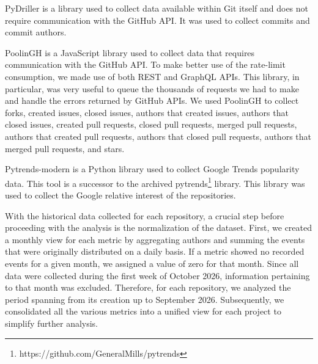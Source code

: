 \documentclass[10pt,conference,peerreview]{IEEEtran}
\begin{document}
PyDriller is a library used to collect data available within Git itself and does not require communication with the GitHub API. It was used to collect commits and commit authors.

PoolinGH is a JavaScript library used to collect data that requires communication with the GitHub API. To make better use of the rate-limit consumption, we made use of both REST and GraphQL APIs. This library, in particular, was very useful to queue the thousands of requests we had to make and handle the errors returned by GitHub APIs. We used PoolinGH to collect forks, created issues, closed issues, authors that created issues, authors that closed issues, created pull requests, closed pull requests, merged pull requests, authors that created pull requests, authors that closed pull requests, authors that merged pull requests, and stars.

Pytrends-modern is a Python library used to collect Google Trends popularity data. This tool is a successor to the archived pytrends\footnote{https://github.com/GeneralMills/pytrends} library. This library was used to collect the Google relative interest of the repositories.



With the historical data collected for each repository, a crucial step before proceeding with the analysis is the normalization of the dataset. First, we created a monthly view for each metric by aggregating authors and summing the events that were originally distributed on a daily basis. If a metric showed no recorded events for a given month, we assigned a value of zero for that month. Since all data were collected during the first week of October 2026, information pertaining to that month was excluded. Therefore, for each repository, we analyzed the period spanning from its creation up to September 2026. Subsequently, we consolidated all the various metrics into a unified view for each project to simplify further analysis.
\end{document}
